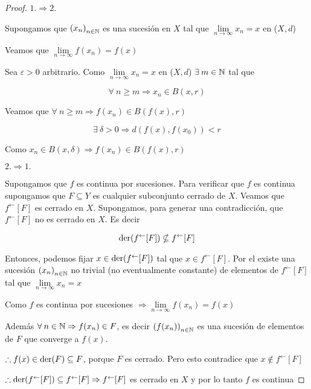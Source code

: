 \begin{proof}
    $1. \Rightarrow 2.$

    Supongamos que ${(x_n)}_{n \in \mathbb{N}}$ es una sucesión en $X$ tal que $\lim\limits_{n \to \infty} x_n = x$ en ($X,d$) 

    Veamos que $\lim\limits_{n \to \infty} f(x_n) = f(x)$

    Sea $\varepsilon > 0$ arbitrario. Como  $\lim\limits_{n \to \infty} x_n = x$ en ($X,d$) $\exists \: m \in \mathbb{N}$ tal que 

    $$\forall \: n \geqslant m \Rightarrow x_n \in B(x,r)$$

    Veamos que $\forall \: n \geqslant m \Rightarrow f(x_n) \in B(f(x),r)$

    $$\exists \: \delta > 0 \Rightarrow d(f(x),f(x_0)) < r$$

    Como $x_n \in B(x,\delta) \Rightarrow f(x_n) \in B(f(x),r)$

    $2. \Rightarrow 1.$

    Supongamos que $f$ es continua por sucesiones. Para verificar que $f$ es continua supongamos que $F \subseteq Y$ es cualquier subconjunto cerrado de $X$. Veamos que $f^\leftarrow[F]$ es cerrado en $X$. Supongamos, para generar una contradicción, que $f^\leftarrow[F]$ no es cerrado en $X$. Es decir

    $$\mathrm{der}(f^\leftarrow[F]) \nsubseteq f^\leftarrow[F]$$

    Entonces, podemos fijar $x \in \mathrm{der}(f^\leftarrow[F])$ tal que $x \in f^\leftarrow[F]$. Por el  existe una sucesión ${(x_n)}_{n \in \mathbb{N}}$ no trivial (no eventualmente constante) de elementos de $f^\leftarrow[F]$ tal que $\lim\limits_{n \to \infty} x_n = x$

    Como $f$ es continua por sucesiones $\Rightarrow \lim\limits_{n \to \infty} f(x_n) = f(x)$

    Además $\forall \: n \in \mathbb{N} \Rightarrow f(x_n) \in F$, es decir ${(f(x_n))}_{n \in \mathbb{N}}$ es una sucesión de elementos de $F$ que converge a $f(x)$. 

    $\therefore f(x) \in \mathrm{der}(F) \subseteq F$, porque $F$ es cerrado. Pero esto contradice que $x \notin f^\leftarrow[F]$

    $\therefore \mathrm{der}(f^\leftarrow[F]) \subseteq f^\leftarrow[F] \Rightarrow f^\leftarrow[F] $ es cerrado en $X$ y por lo tanto $f$ es continua
\end{proof}

